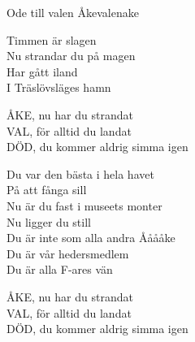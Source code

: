 \begin{song}{Ode till valen Åke}{valenake}
\begin{vers}
Timmen är slagen\\
Nu strandar du på magen\\
Har gått iland\\
I Träslövsläges hamn\\
\end{vers}
\begin{vers}
ÅKE, nu har du strandat\\
VAL, för alltid du landat\\
DÖD, du kommer aldrig simma igen\\
\end{vers}
\begin{vers}
Du var den bästa i hela havet\\
På att fånga sill\\
Nu är du fast i museets monter\\
Nu ligger du still\\
Du är inte som alla andra Ååååke\\
Du är vår hedersmedlem\\
Du är alla F-ares vän\\
\end{vers}
\begin{vers}
ÅKE, nu har du strandat\\
VAL, för alltid du landat\\
DÖD, du kommer aldrig simma igen\\
\end{vers}
\end{song}
